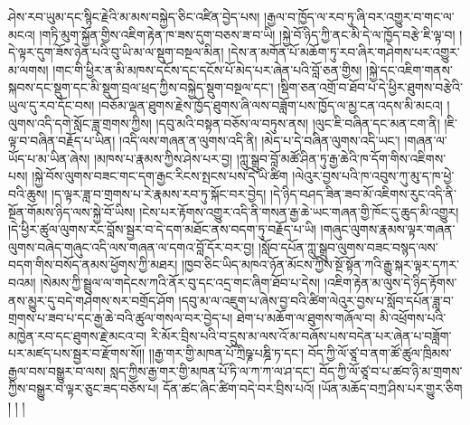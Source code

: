 ཤེས་རབ་ཡུམ་དང་སྙིང་རྗེའི་མ་མས་བསྐྱེད་ཅིང་འཛིན་བྱེད་པས། །རྒྱལ་བ་ཁྱོད་ལ་རབ་ཏུ་ཞི་བར་འགྱུར་བ་གང་ལ་མངའ། །གཏི་མུག་སྐྱོན་གྱིས་འཇིག་རྟེན་ཁ་ཟས་དུག་བཅས་ཟ་བ་ཡི། །སྐྱེ་བོ་ཉིད་ཀྱི་ནང་མི་དེ་ལ་ཁྱོད་བརྩེ་ཇི་ལྟ་བ། །དེ་ལྟར་དུག་ཟོས་ཉེན་པའི་བུ་ཡི་མ་ལ་སྡུག་བསྔལ་མིན། །དེས་ན་མགོན་པོ་མཆོག་ཏུ་རབ་ཞིར་གཤེགས་པར་འགྱུར་མ་ལགས། །གང་གི་ཕྱིར་ན་མི་མཁས་དངོས་དང་དངོས་པོ་མེད་པར་ཞེན་པའི་བློ་ཅན་གྱིས། །སྐྱེ་དང་འཇིག་གནས་སྐབས་དང་སྡུག་དང་མི་སྡུག་བྲལ་ཕྲད་ཀྱིས་བསྐྱེད་སྡུག་བསྔལ་དང་། །སྡིག་ཅན་འགྲོ་བ་ཐོབ་པ་དེ་ཕྱིར་ཐུགས་བརྩེའི་ཡུལ་དུ་རབ་དོང་བས། །བཅོམ་ལྡན་ཐུགས་རྗེས་ཁྱོད་ཐུགས་ཞི་ལས་བཟློག་པས་ཁྱོད་ལ་མྱ་ངན་འདས་མི་མངའ། །ལུགས་འདི་དགེ་སློང་ཟླ་གྲགས་ཀྱིས། །དབུ་མའི་བསྟན་བཅོས་ལ་བཏུས་ནས། །ལུང་ཇི་བཞིན་དང་མན་ངག་ནི། །ཇི་ལྟ་བ་བཞིན་བརྗོད་པ་ཡིན། །འདི་ལས་གཞན་ན་ལུགས་འདི་ནི། །མེད་པ་དེ་བཞིན་ལུགས་འདི་ཡང་། །གཞན་ལ་ཡོད་པ་མ་ཡིན་ཞེས། །མཁས་པ་རྣམས་ཀྱིས་ཤེས་པར་བྱ། །ཀླུ་སྒྲུབ་བློ་མཚོ་ཤིན་ཏུ་རྒྱ་ཆེའི་ཁ་དོག་གིས་འཇིགས་པས། །སྐྱེ་བོས་ལུགས་བཟང་གང་དག་རྒྱང་རིངས་སྤངས་པས་དེ་ཡི་ཚིག །ལེའུར་བྱས་པའི་ཁ་འབུས་ཀུ་མུ་ད་ཁ་ཕྱེ་བའི་ཆུས། །ད་ལྟར་ཟླ་བ་གྲགས་པ་རེ་རྣམས་རབ་ཏུ་སྐོང་བར་བྱེད། །དེ་ཉིད་བཤད་ཟིན་ཟབ་མོ་འཇིགས་རུང་འདི་ནི་སྔོན་གོམས་ཉིད་ལས་སྐྱེ་བོ་ཡིས། །ངེས་པར་རྟོགས་འགྱུར་འདི་ནི་གསན་རྒྱ་ཆེ་ཡང་གཞན་གྱི་ཁོང་དུ་ཆུད་མི་འགྱུར། །དེ་ཕྱིར་ཚུལ་ལུགས་རང་བློས་སྦྱར་བ་དེ་དག་མཐོང་ནས་བདག་ཏུ་བརྗོད་པ་ཡི། །གཞུང་ལུགས་རྣམས་ལྟར་གཞན་ལུགས་བཞེད་གཞུང་འདི་ལས་གཞན་ལ་དགའ་བློ་དོར་བར་བྱ། །སློབ་དཔོན་ཀླུ་སྒྲུབ་ལུགས་བཟང་བསྙད་ལས་བདག་གིས་བསོད་ནམས་ཕྱོགས་ཀྱི་མཐར། །ཁྱབ་ཅིང་ཡིད་མཁའ་ཉོན་མོངས་ཀྱིས་སྔོ་སྟོན་ཀའི་རྒྱུ་སྐར་ལྟར་དཀར་བའམ། །སེམས་ཀྱི་སྦྲུལ་ལ་གདེངས་ཀའི་ནོར་བུ་དང་འདྲ་གང་ཞིག་ཐོབ་པ་དེས། །འཇིག་རྟེན་མ་ལུས་དེ་ཉིད་རྟོགས་ནས་མྱུར་དུ་བདེ་གཤེགས་སར་བགྲོད་ཤོག །དབུ་མ་ལ་འཇུག་པ་ཞེས་བྱ་བའི་ཚིག་ལེའུར་བྱས་པ་སློབ་དཔོན་ཟླ་བ་གྲགས་པ་ཟབ་པ་དང་རྒྱ་ཆེ་བའི་ཚུལ་གསལ་བར་བྱེད་པ། ཐེག་པ་མཆོག་ལ་ཐུགས་གཞོལ་བ། མི་འཕྲོགས་པའི་མཁྱེན་རབ་དང་ཐུགས་རྗེ་མངའ་བ། རི་མོར་བྲིས་པའི་བ་དྲུས་མ་ལས་འོ་མ་བཞོས་པས་བདེན་པར་ཞེན་པ་བཟློག་པར་མཛད་པས་སྦྱར་བ་རྫོགས་སོ།། །།རྒྱ་གར་གྱི་མཁན་པོ་ཀྲིཥྞ་པཎྜི་ཏ་དང་། བོད་ཀྱི་ལོ་ཙཱ་བ་ནག་ཚོ་ཚུལ་ཁྲིམས་རྒྱལ་བས་བསྒྱུར་བ་ལས། སླད་ཀྱིས་རྒྱ་གར་གྱི་མཁན་པོ་ཏི་ལ་ཀ་ཀ་ལ་ཤ་དང་། བོད་ཀྱི་ལོ་ཙཱ་བ་པ་ཚབ་ཉི་མ་གྲགས་ཀྱིས་བསྒྱུར་བ་ལྟར་ཅུང་ཟད་བཅོས་པ། དོན་ཚང་ཞིང་ཚིག་བདེ་བར་བྲིས་པའོ། །ཡོན་མཆོད་བཀྲ་ཤིས་པར་གྱུར་ཅིག ། ། །